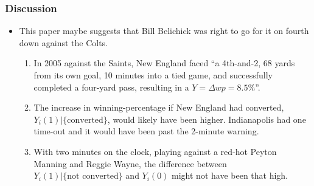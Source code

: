 \documentclass[t]{beamer}
\begin{document}
  \begin{frame}
      \frametitle{Discussion}
      
      \begin{itemize}
    \item This paper maybe suggests that Bill Belichick was right to go for it on fourth down against the Colts.
      \begin{enumerate}
      \item In 2005 against the Saints, New England faced ``a 4th-and-2, 68 yards from its own goal, 10 minutes into a tied game, and successfully completed a four-yard pass, resulting in a $Y=  \Delta wp = 8.5\%$''.
      \item The increase in winning-percentage if New England had converted, $Y_i(1) | \{\text{converted}\}$, would likely have been higher. Indianapolis had one time-out and it would have been past the 2-minute warning.
      \item With two minutes on the clock, playing against a red-hot Peyton Manning and Reggie Wayne, the difference between $Y_i(1) | \{\text{not converted}\}$ and $Y_i(0)$ might not have been that high.
      \end{enumerate}
    \end{itemize}
    \end{frame}
\end{document}
